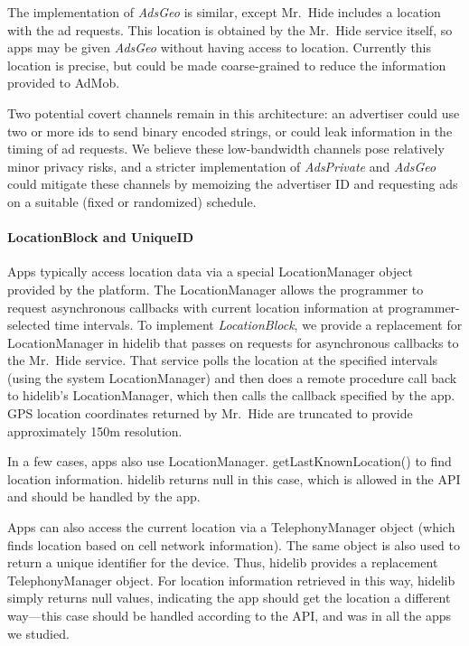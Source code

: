 \documentclass[preprint]{sig-alternate-10pt}
\newcommand{\code}[1]{\textsf{#1}}
\newcommand{\lib}{Mr.\ Hide\xspace}
\newcommand{\perm}[1]{\textsf{\textit{#1}}}
\newcommand{\comment}[3][\color{red}]{}%
\newcommand{\jeff}[1]{\comment[\color{green}]{JSF}{#1}}
\newcommand{\polAdsBlindName}{\perm{AdsPrivate}\xspace}
\newcommand{\polAdsGeoName}{\perm{AdsGeo}\xspace}
\begin{document}
The implementation of \polAdsGeoName is similar, except
\lib includes a location with the ad requests.  This location
is obtained by the \lib service itself,
so apps may be given \polAdsGeoName without having
access to location.
Currently this location is
precise, but could be made coarse-grained to reduce the information 
provided to AdMob.



Two potential covert channels remain in this architecture: an advertiser could
use two or more ids to send binary encoded strings, or could leak
information in the timing of ad requests.  We believe these low-bandwidth
channels pose relatively minor privacy risks, and
a stricter implementation of
\polAdsBlindName and \polAdsGeoName could mitigate these channels by memoizing the
advertiser ID and requesting ads on a suitable (fixed or randomized) schedule.

\paragraph*{LocationBlock and UniqueID}

Apps typically access location data via a special
\code{LocationManager} object provided by the platform. The
\code{LocationManager} allows the programmer to request asynchronous
callbacks with current location information at programmer-selected
time intervals. To implement \perm{LocationBlock}, we provide a
replacement for \code{LocationManager} in \code{hidelib} that passes on
requests for asynchronous callbacks to the \lib service. That service
polls the location at the specified intervals (using the system
\code{LocationManager}) and then does a remote procedure call back to
\code{hidelib}'s \code{LocationManager}, which then calls the callback
specified by the app. GPS location coordinates returned by \lib are
truncated to provide approximately 150m resolution.

In a few cases, apps also use
\code{LocationManager.} \code{getLastKnownLocation()} to find location
information. \code{hidelib} returns null in this case, which is
allowed in the API and should be handled by the app.

Apps can also access the current location via a
\code{TelephonyManager} object (which finds location based on cell
network information). The same object is also used to return a unique
identifier for the device. Thus, \code{hidelib} provides a
replacement \code{TelephonyManager} object. For location information
retrieved in this way, \code{hidelib} simply returns null values,
indicating the app should get the location a different way---this case
should be handled according to the API, and was in all the apps we
studied.
\end{document}
